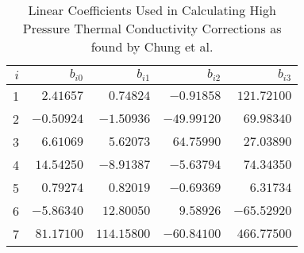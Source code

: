 \begin{table} \label{chung_conductivity_bij}
\caption{Linear Coefficients Used in Calculating High Pressure Thermal Conductivity Corrections as found by Chung et al. \cite{chung:1988}}
\begin{center}
\begin{tabular}{ r || r r r r }
$i$ & $b_{i0}$ & $b_{i1}$ & $b_{i2}$ & $b_{i3}$ \\
\hline
1 & $2.41657$ & $0.74824$ & $-0.91858$ & $121.72100$ \\
2 & $-0.50924$ & $-1.50936$ & $-49.99120$ & $69.98340$ \\
3 & $6.61069$ & $5.62073$ & $64.75990$ & $27.03890$ \\
4 & $14.54250$ & $-8.91387$ & $-5.63794$ & $74.34350$ \\
5 & $0.79274$ & $0.82019$ & $-0.69369$ & $6.31734$ \\
6 & $-5.86340$ & $12.80050$ & $9.58926$ & $-65.52920$ \\
7 & $81.17100$ & $114.15800$ & $-60.84100$ & $466.77500$ \\
\end{tabular}
\end{center}
\end{table}

